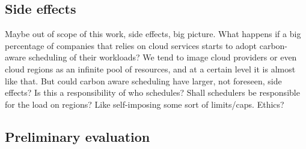 \subsection{Side effects}

Maybe out of scope of this work, side effects, big picture.
What happens if a big percentage of companies that relies on cloud services starts to adopt carbon-aware scheduling of their workloads?
We tend to image cloud providers or even cloud regions as an infinite pool of resources, and at a certain level it is almost like that. But could carbon aware scheduling have larger, not foreseen, side effects?
Is this a responsibility of who schedules? Shall schedulers be responsible for the load on regions? Like self-imposing some sort of limits/caps. Ethics?

\subsection{Preliminary evaluation}

\begin{comment}
for the purpose of this theses

boavizta API simulation

assumptions
- analysis limited to only cloud VM, (aligned with the scope of this theses)
- data related to GCP is not data from boavizta (even if gcp is supported in our current system) but mapped from azure and aws

limitations
- whole countries, not regions


not easily integratable in a real production system due to its quite restrictive license (AGPL 3)
it is still usable for research purposes like in this case.
\end{comment}






\newpage

